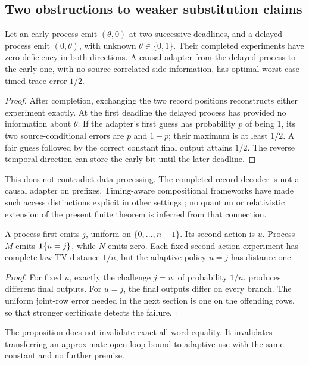 \subsection{Two obstructions to weaker substitution claims}
\begin{proposition}\label{p2-21}
Let an early process emit \((\theta,0)\) at two successive deadlines, and a delayed process emit \((0,\theta)\), with unknown \(\theta\in\{0,1\}\). Their completed experiments have zero deficiency in both directions. A causal adapter from the delayed process to the early one, with no source-correlated side information, has optimal worst-case timed-trace error \(1/2\).
\end{proposition}
\begin{proof}
After completion, exchanging the two record positions reconstructs either experiment exactly. At the first deadline the delayed process has provided no information about \(\theta\). If the adapter's first guess has probability \(p\) of being 1, its two source-conditional errors are \(p\) and \(1-p\); their maximum is at least \(1/2\). A fair guess followed by the correct constant final output attains \(1/2\). The reverse temporal direction can store the early bit until the later deadline.
\end{proof}
This does not contradict data processing. The completed-record decoder is not a causal adapter on prefixes. Timing-aware compositional frameworks have made such access distinctions explicit in other settings \cite{PortmannEtAl2017}; no quantum or relativistic extension of the present finite theorem is inferred from that connection.

\begin{proposition}\label{p2-22}
A process first emits \(j\), uniform on \(\{0,\ldots,n-1\}\). Its second action is \(u\). Process \(M\) emits \(\mathbf 1\{u=j\}\), while \(N\) emits zero. Each fixed second-action experiment has complete-law TV distance \(1/n\), but the adaptive policy \(u=j\) has distance one.
\end{proposition}
\begin{proof}
For fixed \(u\), exactly the challenge \(j=u\), of probability \(1/n\), produces different final outputs. For \(u=j\), the final outputs differ on every branch. The uniform joint-row error needed in the next section is one on the offending rows, so that stronger certificate detects the failure.
\end{proof}
The proposition does not invalidate exact all-word equality. It invalidates transferring an approximate open-loop bound to adaptive use with the same constant and no further premise.


